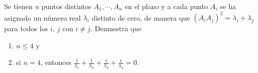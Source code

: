 Se tienen $n$ puntos distintos $A_1, \cdots , A_n$ en el plano y a cada punto $A_i$ se ha asignado un número real $\lambda_i$ distinto de cero, de manera que $(A_i A_j)^2 = \lambda_i + \lambda_j$ para todos los $i$, $j$ con $i \neq j$. Demuestra que
 \begin{enumerate} 
   \item  $n \leq 4$ y
   \item  si $n = 4$, entonces $\frac{1}{\lambda_1} + \frac{1}{\lambda_2} + \frac{1}{\lambda_3} + \frac{1}{\lambda_4} = 0$.
 \end{enumerate} 
